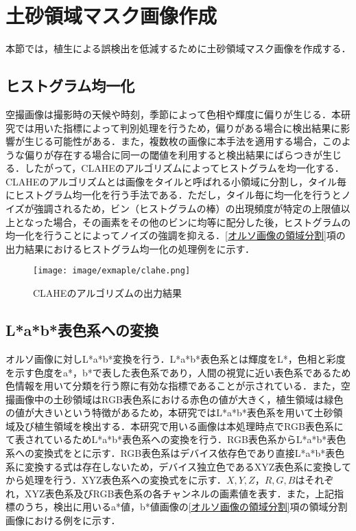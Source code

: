   \section{土砂領域マスク画像作成}
    \label{土砂領域マスク画像作成}
    本節では，植生による誤検出を低減するために土砂領域マスク画像を作成する．


    \subsection{ヒストグラム均一化}
      空撮画像は撮影時の天候や時刻，季節によって色相や輝度に偏りが生じる．本研究では用いた指標によって判別処理を行うため，偏りがある場合に検出結果に影響が生じる可能性がある．また，複数枚の画像に本手法を適用する場合，このような偏りが存在する場合に同一の閾値を利用すると検出結果にばらつきが生じる．したがって，CLAHEのアルゴリズム\cite{CLAHEのアルゴリズム}によってヒストグラムを均一化する．CLAHEのアルゴリズムとは画像をタイルと呼ばれる小領域に分割し，タイル毎にヒストグラム均一化を行う手法である．ただし，タイル毎に均一化を行うとノイズが強調されるため，ビン（ヒストグラムの棒）の出現頻度が特定の上限値以上となった場合，その画素をその他のビンに均等に配分した後，ヒストグラムの均一化を行うことによってノイズの強調を抑える．\ref{オルソ画像の領域分割}項の出力結果におけるヒストグラム均一化の処理例をに示す．

      \begin{figure}[t]
        \centering
        \texttt{[image: image/exmaple/clahe.png]}
        \caption{CLAHEのアルゴリズムの出力結果}
        \label{CLAHEのアルゴリズム結果}
      \end{figure}


    \subsection{L*a*b*表色系への変換}
      オルソ画像に対しL*a*b*変換\cite{Lab表色系1}を行う．L*a*b*表色系とは輝度をL*，色相と彩度を示す色度をa*，b*で表した表色系であり，人間の視覚に近い表色系であるため色情報を用いて分類を行う際に有効な指標であることが示されている．また，空撮画像中の土砂領域はRGB表色系における赤色の値が大きく，植生領域は緑色の値が大きいという特徴があるため，本研究ではL*a*b*表色系を用いて土砂領域及び植生領域を検出する\cite{Lab表色系2, Lab表色系3, Lab表色系4}．本研究で用いる画像は本処理時点でRGB表色系にて表されているためL*a*b*表色系への変換を行う．RGB表色系からL*a*b*表色系への変換式をとに示す．RGB表色系はデバイス依存色であり直接L*a*b*表色系に変換する式は存在しないため，デバイス独立色であるXYZ表色系\cite{XYZ表色系}に変換してから処理を行う．XYZ表色系への変換式をに示す．$X,Y,Z$，$R,G,B$はそれぞれ，XYZ表色系及びRGB表色系の各チャンネルの画素値を表す．また，上記指標のうち，検出に用いるa*値，b*値画像の\ref{オルソ画像の領域分割}項の領域分割画像における例をに示す．


